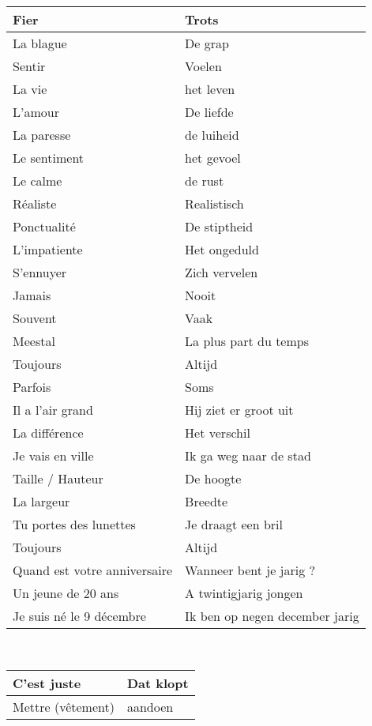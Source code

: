\documentclass[a4paper]{article}
\begin{document}
\begin{center}
\begin{tabular}{|l|l|}
    \hline
    Fier & Trots\\
    \hline
    La blague & De grap\\
    \hline
    Sentir & Voelen\\
    \hline
    La vie & het leven\\
    \hline
    L'amour & De liefde\\
    \hline
    La paresse & de luiheid\\
    \hline
    Le sentiment & het gevoel\\
    \hline
    Le calme & de rust\\
    \hline
    Réaliste & Realistisch\\
    \hline
    Ponctualité & De stiptheid\\
    \hline
    L'impatiente & Het ongeduld \\
    \hline
    S'ennuyer & Zich vervelen\\
    \hline
    Jamais & Nooit\\
    \hline
    Souvent & Vaak\\
    \hline
    Meestal & La plus part du temps\\
    \hline
    Toujours & Altijd\\
    \hline
    Parfois & Soms\\
    \hline
    Il a l'air grand & Hij ziet er groot uit\\
    \hline
    La différence & Het verschil \\
    \hline
    Je vais en ville & Ik ga weg naar de stad\\
    \hline
    Taille / Hauteur & De hoogte\\
    \hline
    La largeur & Breedte\\
    \hline
    Tu portes des lunettes & Je draagt een bril\\
    \hline
    Toujours & Altijd\\
    \hline
    Quand est votre anniversaire & Wanneer bent je jarig ?\\
    \hline
    Un jeune de 20 ans & A twintigjarig jongen\\
    \hline
    Je suis né le 9 décembre & Ik ben op negen december jarig\\
    \hline
  \end{tabular}\\
  \begin{tabular}{|l|l|}
    \hline
    C'est juste & Dat klopt\\
    \hline
    Mettre (vêtement) & aandoen\\

\end{tabular}
\end{center}
\end{document}
